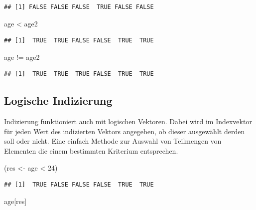 \documentclass[
]{book}
\newenvironment{Shaded}{\begin{snugshade}}{\end{snugshade}}
\newcommand{\DecValTok}[1]{\textcolor[rgb]{0.00,0.00,0.81}{#1}}
\newcommand{\NormalTok}[1]{#1}
\newcommand{\OtherTok}[1]{\textcolor[rgb]{0.56,0.35,0.01}{#1}}
\newcommand{\SpecialCharTok}[1]{\textcolor[rgb]{0.00,0.00,0.00}{#1}}
\begin{document}
\begin{verbatim}
## [1] FALSE FALSE FALSE  TRUE FALSE FALSE
\end{verbatim}

\begin{Shaded}
\begin{Highlighting}[]
\NormalTok{age }\SpecialCharTok{\textless{}}\NormalTok{ age2 }
\end{Highlighting}
\end{Shaded}

\begin{verbatim}
## [1]  TRUE  TRUE FALSE FALSE  TRUE  TRUE
\end{verbatim}

\begin{Shaded}
\begin{Highlighting}[]
\NormalTok{age }\SpecialCharTok{!=}\NormalTok{ age2}
\end{Highlighting}
\end{Shaded}

\begin{verbatim}
## [1]  TRUE  TRUE  TRUE FALSE  TRUE  TRUE
\end{verbatim}

\hypertarget{logische-indizierung}{%
\subsection{Logische Indizierung}\label{logische-indizierung}}

Indizierung funktioniert auch mit logischen Vektoren. Dabei wird im Indexvektor für jeden Wert des indizierten Vektors angegeben, ob dieser ausgewählt derden soll oder nicht.
Eine einfach Methode zur Auswahl von Teilmengen von Elementen die einem bestimmten Kriterium entsprechen.

\begin{Shaded}
\begin{Highlighting}[]
\NormalTok{(res }\OtherTok{\textless{}{-}}\NormalTok{ age }\SpecialCharTok{\textless{}} \DecValTok{24}\NormalTok{)}
\end{Highlighting}
\end{Shaded}

\begin{verbatim}
## [1]  TRUE FALSE FALSE FALSE  TRUE  TRUE
\end{verbatim}

\begin{Shaded}
\begin{Highlighting}[]
\NormalTok{age[res]}
\end{Highlighting}
\end{Shaded}
\end{document}
